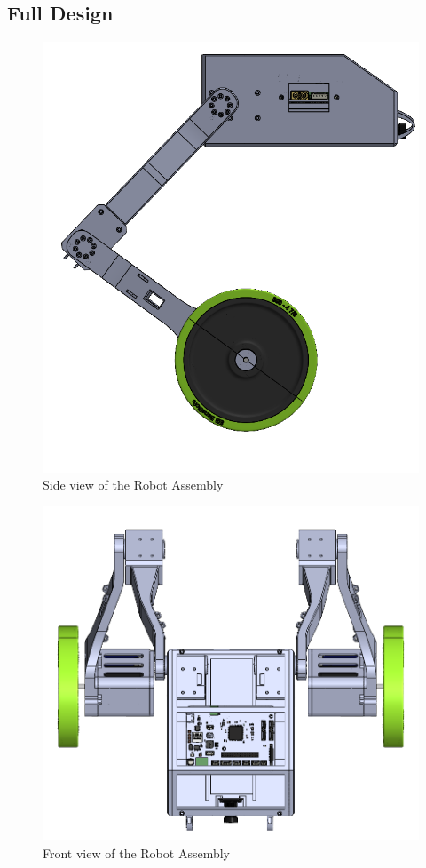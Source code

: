 \subsection{Full Design}


\begin{figure}[h]
	\centering
	\includegraphics[width=1\linewidth]{Robot_Assembly_1}
	\caption[Side view of the Robot Assembly]{Side view of the Robot Assembly}
	\label{fig:robotassembly1}
\end{figure}
\begin{figure}[h]
	\centering
	\includegraphics[width=1\linewidth]{Robot_Assembly_2}
	\caption[Front view of the Robot Assembly]{Front view of the Robot Assembly}
	\label{fig:robotassembly2}
\end{figure}
